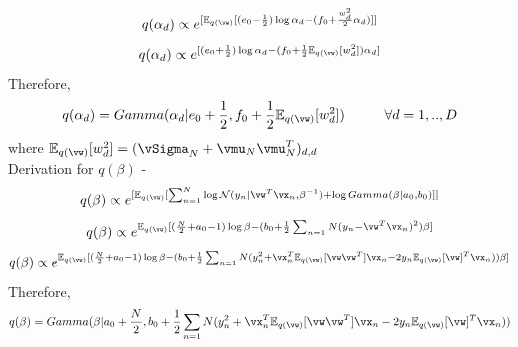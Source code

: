 \documentclass[a4paper,11pt]{article}
\begin{document}
\begin{pmisolution}
\[q(\alpha_d) \propto e^{[\mathbb{E}_{q(\vw)}[(e_0 -\frac{1}{2})\log \alpha_d - (f_0 + \frac{w_{d}^{2}}{2}\alpha_d)]]}\]
\[q(\alpha_d) \propto e^{[(e_0 + \frac{1}{2})\log \alpha_d - (f_0 + \frac{1}{2}\mathbb{E}_{q(\vw)}[w_d^2])\alpha_d]}\]
Therefore,
\[q(\alpha_d) = Gamma(\alpha_d| e_0 + \frac{1}{2}, f_0 + \frac{1}{2}\mathbb{E}_{q(\vw)}[w_d^2]) \hspace*{1cm} \forall d={1,..,D}\]
where \( \mathbb{E}_{q(\vw)}[w_d^2] = (\vSigma_N + \vmu_N\vmu_N^T)_{d,d}\)\\
Derivation for \(q(\beta)\) - \\
\[q(\beta) \propto e^{[\mathbb{E}_{q(\vw)}[\sum_{n=1}^{N} \log \mathcal{N}(y_n|\vw^{T}\vx_n,\beta^{-1}) + \log Gamma(\beta|a_0,b_0)]]}\]
\[q(\beta) \propto e^{\mathbb{E}_{q(\vw)}[(\frac{N}{2} + a_0 -1)\log \beta - (b_0 + \frac{1}{2}\sum_{n=1}{N}(y_n - \vw^{T}\vx_{n})^2)\beta]}\]
\[q(\beta) \propto e^{\mathbb{E}_{q(\vw)}[(\frac{N}{2} + a_0 -1)\log \beta - (b_0 + \frac{1}{2}\sum_{n=1}{N}(y_n^2 + \vx_n^{T}\mathbb{E}_{q(\vw)}[\vw\vw^T]\vx_n -  2y_{n}\mathbb{E}_{q(\vw)}[\vw]^{T}\vx_{n}))\beta]}\]
Therefore, 
\[q(\beta) = Gamma(\beta | a_0 + \frac{N}{2}, b_0 + \frac{1}{2}\sum_{n=1}{N}(y_n^2 + \vx_n^{T}\mathbb{E}_{q(\vw)}[\vw\vw^T]\vx_n -  2y_{n}\mathbb{E}_{q(\vw)}[\vw]^{T}\vx_{n}))\]

\end{pmisolution}
\end{document}
